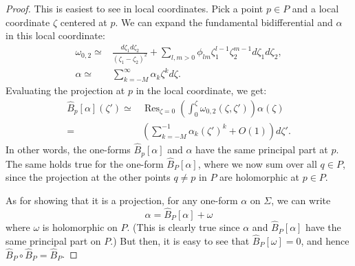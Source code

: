 \documentclass[10pt,a4paper]{amsart}
\DeclareMathOperator*{\Res}{Res}
\begin{document}
\begin{proof}
This is easiest to see in local coordinates. Pick a point $p \in P$ and a local coordinate $\zeta$ centered at $p$. We can expand the fundamental bidifferential and $\alpha$ in this local coordinate:
\begin{align}
\omega_{0,2}\simeq& \frac{d \zeta_1 d \zeta_2}{(\zeta_1-\zeta_2)^2} + \sum_{l,m> 0} \phi_{lm}  \zeta_1^{l-1} \zeta_2^{m-1} d \zeta_1 d \zeta_2,\\
\alpha \simeq& \sum_{k=-M}^\infty \alpha_k \zeta^{k} d \zeta.
\end{align}
Evaluating the projection at  $p$ in the local coordinate, we get:
\begin{align}
\hat{B}_p[\alpha](\zeta') \simeq& \Res_{\zeta=0} \left( \int^\zeta_0 \omega_{0,2}(\zeta,\zeta') \right) \alpha(\zeta) \\
=& \left( \sum_{k=-M}^{-1} \alpha_k (\zeta')^k  + O(1) \right) d \zeta'.
\end{align}
In other words, the one-forms $\hat{B}_p[\alpha]$ and $\alpha$ have the same principal part at $p$. The same holds true for the one-form $\hat{B}_P[\alpha]$, where we now sum over all $q \in P$, since the projection at the other points $q \neq p$ in $P$ are holomorphic at $p \in P$.

As for showing that it is a projection, for any one-form $\alpha$ on $\Sigma$, we can write
\begin{equation}
\alpha = \hat{B}_P[\alpha] + \omega
\end{equation}
where $\omega$ is holomorphic on $P$. (This is clearly true since $\alpha$ and $\hat{B}_P[\alpha]$ have the same principal part on $P$.) But then, it is easy to see that $\hat{B}_P[\omega] = 0$, and hence $\hat{B}_P \circ \hat{B}_P = \hat{B}_P$.
\end{proof}
\end{document}

